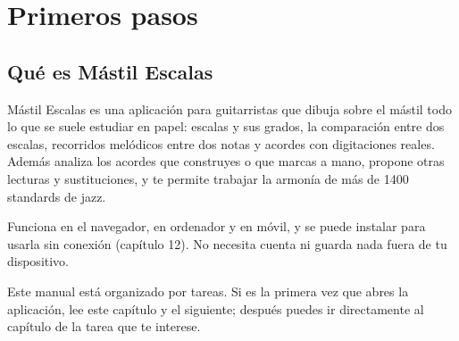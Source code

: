 \documentclass[a4paper,11pt,oneside]{report}
\begin{document}
\begin{titlepage}
\end{titlepage}
\restoregeometry
\clearpage

\tableofcontents
\clearpage
{}
\setcounter{page}{1}

\chapter{Primeros pasos}\label{primeros-pasos}

\Needspace{3.5cm}
\section{Qué es Mástil Escalas}\label{quuxe9-es-muxe1stil-escalas}

Mástil Escalas es una aplicación para guitarristas que dibuja sobre el mástil todo lo que se suele estudiar en papel: escalas y sus grados, la comparación entre dos escalas, recorridos melódicos entre dos notas y acordes con digitaciones reales. Además analiza los acordes que construyes o que marcas a mano, propone otras lecturas y sustituciones, y te permite trabajar la armonía de más de 1400 standards de jazz.

Funciona en el navegador, en ordenador y en móvil, y se puede instalar para usarla sin conexión (capítulo 12). No necesita cuenta ni guarda nada fuera de tu dispositivo.

Este manual está organizado por tareas. Si es la primera vez que abres la aplicación, lee este capítulo y el siguiente; después puedes ir directamente al capítulo de la tarea que te interese.

\Needspace{3.5cm}
\end{document}
